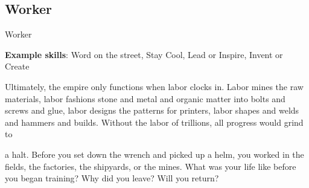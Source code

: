 \subsection{Worker}
                                                      Worker

\textbf{Example skills}: Word on the street, Stay Cool, Lead or Inspire, Invent or Create

Ultimately, the empire only functions when labor clocks in. Labor mines the raw materials, labor fashions
stone and metal and organic matter into bolts and screws and glue, labor designs the patterns for printers,
labor shapes and welds and hammers and builds. Without the labor of trillions, all progress would grind to

a halt. Before you set down the wrench and picked up a helm, you worked in the fields, the factories, the
shipyards, or the mines. What was your life like before you began training? Why did you leave? Will you
return?



